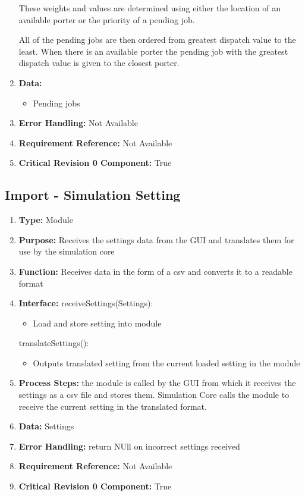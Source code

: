 \documentclass[paper=letter, fontsize=10pt]{scrartcl}
\numberwithin{equation}{section}		%
\numberwithin{figure}{section}			%
\numberwithin{table}{section}				%
\begin{document}
\begin{enumerate}[]
	These weights and values are determined using either the location of an available porter or the priority of a pending job.
	
	All of the pending jobs are then ordered from greatest dispatch value to the least.  When there is an available porter the pending job with the greatest dispatch value is given to the closest porter.
	\item \textbf{Data:}
		\begin{itemize}
			\item Pending jobs
		\end{itemize}
	\item \textbf{Error Handling:} Not Available
	\item \textbf{Requirement Reference:} Not Available
	\item \textbf{Critical Revision 0 Component:} True
\end{enumerate}
\subsection{Import - Simulation Setting}
\begin{enumerate}[]
	\item \textbf{Type:} Module
	\item \textbf{Purpose:} Receives the settings data from the GUI and translates them for use by the simulation core
	\item \textbf{Function:} Receives data in the form of a csv and converts it to a readable format
	\item \textbf{Interface:} \newline
	receiveSettings(Settings):
	 	\begin{itemize}
	 		\item Load and store setting into module
	 	\end{itemize}
	 translateSettings():
	 	\begin{itemize}
	 		\item Outputs translated setting from the current loaded setting in the module
	 	\end{itemize}
	\item \textbf{Process Steps:} the module is called by the GUI from which it receives the settings as a csv file and stores them. Simulation Core calls the module to receive the current setting in the translated format. 
	\item \textbf{Data:} Settings
	\item \textbf{Error Handling:} return NUll on incorrect settings received
	\item \textbf{Requirement Reference:} Not Available
	\item \textbf{Critical Revision 0 Component:} True
\end{enumerate}
\end{document}
